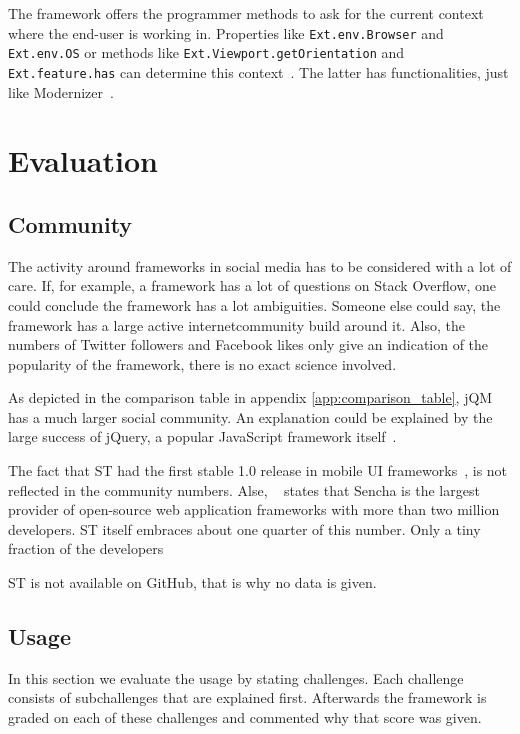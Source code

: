 \documentclass[a4paper]{artikel3}
\newcommand{\code}[1]{\texttt{#1}}
\begin{document}
The framework offers the programmer methods to ask for the current context where the end-user is working in. 
Properties like \code{Ext.env.Browser} and \code{Ext.env.OS} or methods like \code{Ext.Viewport.getOrientation} and \code{Ext.feature.has} can determine this context~\cite{JohnEClark2012}.  
The latter has functionalities,  just like Modernizer~\cite{Modernizr2012}.  

\section{Evaluation}

\subsection{Community} %
\label{sec:community}

The activity around frameworks in social media has to be considered with a lot of care.  
If,  for example,  a framework has a lot of questions on Stack Overflow,  one could conclude the framework has a lot ambiguities.  
Someone else could say,  the framework has a large active internetcommunity build around it.  
Also,  the numbers of Twitter followers and Facebook likes only give an indication of the popularity of the framework,  there is no exact science involved.

As depicted in the comparison table in appendix \ref{app:comparison_table},  jQM has a much larger social community.  
An explanation could be explained by the large success of jQuery,  a popular JavaScript framework itself~\cite{Hales2012}.

The fact that ST had the first stable 1.0 release in mobile UI frameworks~\cite{Oeflman2011},  is not reflected in the community numbers.  
Alse,  ~\cite{Inc.} states that Sencha is the largest provider of open-source web application frameworks with more than two million developers.  
ST itself embraces about one quarter of this number.  Only a tiny fraction of the developers 

ST is not available on GitHub,  that is why no data is given.

\subsection{Usage}
\label{sec:poc}
In this section we evaluate the usage by stating challenges.
Each challenge consists of subchallenges that are explained first.
Afterwards the framework is graded on each of these challenges and commented why that score was given.
\end{document}
